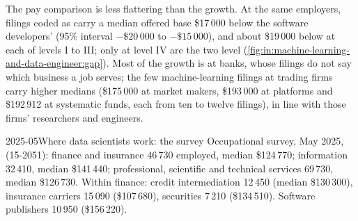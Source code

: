 The pay comparison is less flattering than the growth. At the same employers, filings coded as  carry a
median offered base \$17\,000 below the software developers' (95\% interval $-\$20\,000$ to $-\$15\,000$), and about
\$19\,000 below at each of levels I to III; only at level IV are the two level (\cref{fig:in:machine-learning-and-data-engineer:gap}).
Most of the growth is at banks, whose filings do not say which business a job serves; the few
machine-learning filings at trading firms carry higher medians (\$175\,000 at market makers, \$193\,000 at platforms and
\$192\,912 at systematic funds, each from ten to twelve filings), in line with those firms' researchers and engineers.

\begin{omfigure}

\label{fig:in:machine-learning-and-data-engineer:gap}
\end{omfigure}

\begin{dated}{2025-05}{Where data scientists work: the survey}\label{dat:in:machine-learning-and-data-engineer:survey}
Occupational survey, May 2025,  (15-2051): finance and insurance 46\,730 employed, median \$124\,770;
information 32\,410, median \$141\,440; professional, scientific and technical services 69\,730, median \$126\,730.
Within finance: credit intermediation 12\,450 (median \$130\,300), insurance carriers 15\,090 (\$107\,680), securities
7\,210 (\$134\,510). Software publishers 10\,950 (\$156\,220).
\end{dated}

